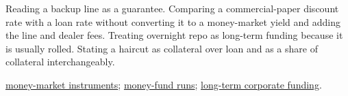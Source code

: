 \begin{qfdefinition}
 Reading a backup line as a guarantee. Comparing a commercial-paper discount rate with a loan rate without converting it to a money-market yield and adding the line and dealer fees. Treating overnight repo as long-term funding because it is usually rolled. Stating a haircut as collateral over loan and as a share of collateral interchangeably.

 \hyperref[def:money-market-reference-rates]{money-market instruments}; \hyperref[ev:money-fund-runs]{money-fund runs}; \hyperref[meth:corporate-funding-ig-hy]{long-term corporate funding}.

\end{qfdefinition}
